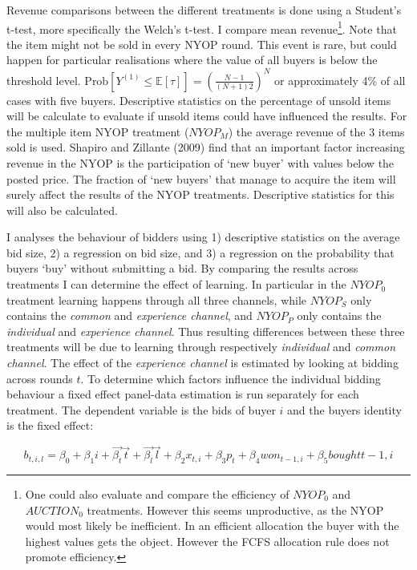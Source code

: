 \documentclass[a4paper,12pt]{article}
\begin{document}
	Revenue comparisons between the different treatments is done using a Student's t-test, more specifically the Welch's t-test. I compare mean revenue\footnote{\label{footnote:efficient}One could also evaluate and compare the efficiency of $NYOP_0$ and $AUCTION_0$ treatments. However this seems unproductive, as the NYOP would most likely be inefficient. In an efficient allocation the buyer with the highest values gets the object. However the FCFS allocation rule does not promote efficiency.}. Note that the item might not be sold in every NYOP round. This event is rare, but could happen for particular realisations where the value of all buyers is below the threshold level. $\mbox{Prob}[Y^{(1)} \le \mathbb{E}[\tau]] = \left(\frac{N-1}{(N+1)2}\right)^N$ or approximately 4\% of all cases with five buyers. Descriptive statistics on the percentage of unsold items will be calculate to evaluate if unsold items could have influenced the results. For the multiple item NYOP treatment ($NYOP_M$) the average revenue of the 3 items sold is used. Shapiro and Zillante (2009) find that an important factor increasing revenue in the NYOP is the participation of `new buyer' with values below the posted price. The fraction of `new buyers' that manage to acquire the item will surely affect the results of the NYOP treatments. Descriptive statistics for this will also be calculated.

	I analyses the behaviour of bidders using 1) descriptive statistics on the average bid size, 2) a regression on bid size, and 3) a regression on the probability that buyers `buy' without submitting a bid. By comparing the results across treatments I can determine the effect of learning. In particular in the $NYOP_0$ treatment learning happens through all three channels, while $NYOP_S$ only contains the \emph{common} and \emph{experience channel}, and $NYOP_P$ only contains the \emph{individual} and \emph{experience channel}. Thus resulting differences between these three treatments will be due to learning through respectively \emph{individual} and \emph{common channel}. The effect of the \emph{experience channel} is estimated by looking at bidding across rounds $t$. To determine which factors influence the individual bidding behaviour a fixed effect panel-data estimation is run separately for each treatment. The dependent variable is the bids of buyer $i$ and the buyers identity is the fixed effect:

	\[ b_{t,i,l} = \beta_0 + \beta_1 i + \vec{\beta_t} \vec{t} + \vec{\beta_l} \vec{l} + \beta_2 x_{t,i} + \beta_3 p_t + \beta_4 won_{t-1,i} + \beta_5 bought{t-1,i} \]
\end{document}
